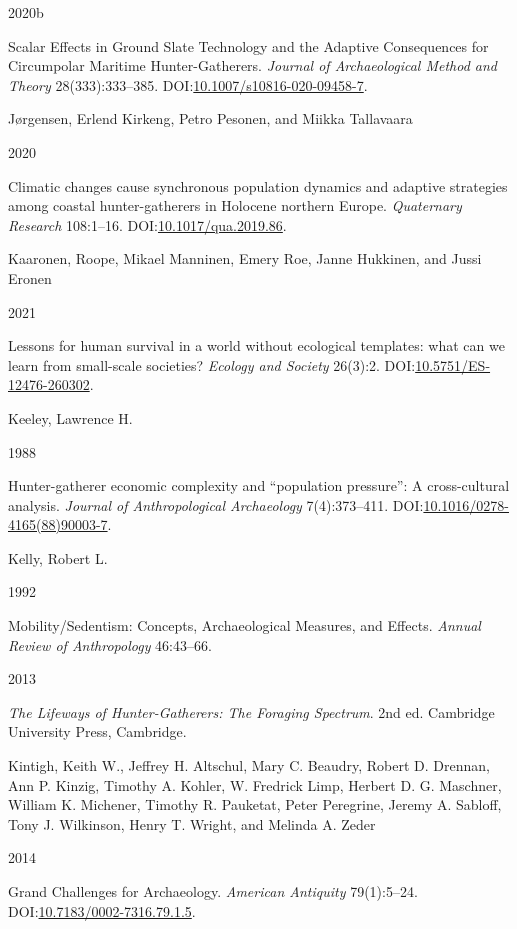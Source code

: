 \documentclass[
  12pt,
  a4paper,
  oneside]{book}
\newlength{\cslhangindent}
\newlength{\csllabelwidth}
\newlength{\cslentryspacingunit} %
\newenvironment{CSLReferences}[2] %
 {%
  \setlength{\parindent}{0pt}
  \ifodd #1
  \let\oldpar\par
  \def\par{\hangindent=\cslhangindent\oldpar}
  \fi
  \setlength{\parskip}{#2\cslentryspacingunit}
 }%
 {}
\newcommand{\CSLBlock}[1]{#1\hfill\break}
\newcommand{\CSLLeftMargin}[1]{\parbox[t]{\csllabelwidth}{#1}}
\newcommand{\CSLRightInline}[1]{\parbox[t]{\linewidth - \csllabelwidth}{#1}\break}
\begin{document}
\begin{CSLReferences}{0}{0}
\leavevmode{}%
\CSLLeftMargin{ 2020b }
\CSLRightInline{{Scalar Effects in Ground Slate Technology and the Adaptive Consequences for Circumpolar Maritime Hunter-Gatherers}. \emph{Journal of Archaeological Method and Theory} 28(333):333--385. DOI:\href{https://doi.org/10.1007/s10816-020-09458-7}{10.1007/s10816-020-09458-7}.}

\leavevmode{}%
\CSLBlock{Jørgensen, Erlend Kirkeng, Petro Pesonen, and Miikka Tallavaara}
\CSLLeftMargin{ 2020}
\CSLRightInline{{Climatic changes cause synchronous population dynamics and adaptive strategies among coastal hunter-gatherers in Holocene northern Europe}. \emph{Quaternary Research} 108:1--16. DOI:\href{https://doi.org/10.1017/qua.2019.86}{10.1017/qua.2019.86}.}

\leavevmode{}%
\CSLBlock{Kaaronen, Roope, Mikael Manninen, Emery Roe, Janne Hukkinen, and Jussi Eronen}
\CSLLeftMargin{ 2021}
\CSLRightInline{Lessons for human survival in a world without ecological templates: what can we learn from small-scale societies? \emph{Ecology and Society} 26(3):2. DOI:\href{https://doi.org/10.5751/ES-12476-260302}{10.5751/ES-12476-260302}.}

\leavevmode{}%
\CSLBlock{Keeley, Lawrence H.}
\CSLLeftMargin{ 1988}
\CSLRightInline{Hunter-gatherer economic complexity and {``population pressure''}: A cross-cultural analysis. \emph{Journal of Anthropological Archaeology} 7(4):373--411. DOI:\href{https://doi.org/10.1016/0278-4165(88)90003-7}{10.1016/0278-4165(88)90003-7}.}

\leavevmode{}%
\CSLBlock{Kelly, Robert L.}
\CSLLeftMargin{ 1992}
\CSLRightInline{{Mobility/Sedentism: Concepts, Archaeological Measures, and Effects}. \emph{Annual Review of Anthropology} 46:43--66.}

\leavevmode{}%
\CSLLeftMargin{ 2013 }
\CSLRightInline{\emph{{The Lifeways of Hunter-Gatherers: The Foraging Spectrum}}. 2nd ed. Cambridge University Press, Cambridge.}

\leavevmode{}%
\CSLBlock{Kintigh, Keith W., Jeffrey H. Altschul, Mary C. Beaudry, Robert D. Drennan, Ann P. Kinzig, Timothy A. Kohler, W. Fredrick Limp, Herbert D. G. Maschner, William K. Michener, Timothy R. Pauketat, Peter Peregrine, Jeremy A. Sabloff, Tony J. Wilkinson, Henry T. Wright, and Melinda A. Zeder}
\CSLLeftMargin{ 2014}
\CSLRightInline{{Grand Challenges for Archaeology}. \emph{American Antiquity} 79(1):5--24. DOI:\href{https://doi.org/10.7183/0002-7316.79.1.5}{10.7183/0002-7316.79.1.5}.}


\end{CSLReferences}
\end{document}
